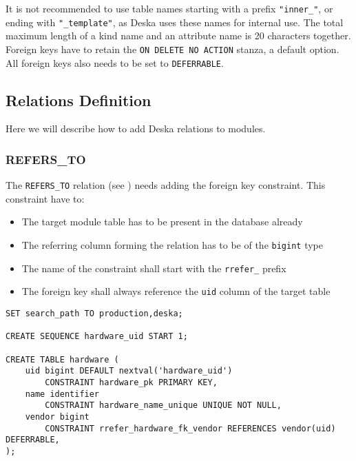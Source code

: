 \documentclass[deska]{subfiles}
\begin{document}
It is not recommended to use table names starting with a prefix {\tt "inner\_"}, or ending with {\tt "\_template"}, as
Deska uses these names for internal use.  The total maximum length of a kind name and an attribute name is 20 characters
together.  Foreign keys have to retain the {\tt ON DELETE NO ACTION} stanza, a default option. All foreign keys also
needs to be set to {\tt DEFERRABLE}.

\subsection{Relations Definition}
Here we will describe how to add Deska relations to modules.


\subsubsection{REFERS\_TO}
\label{sec:db-scheme-refers-to}

The {\tt REFERS\_TO} relation (see ) needs adding the foreign key constraint. This
constraint have to:

\begin{itemize}
    \item The target module table has to be present in the database already
    \item The referring column forming the relation has to be of the {\tt bigint} type
    \item The name of the constraint shall start with the {\tt rrefer\_} prefix
    \item The foreign key shall always reference the {\tt uid} column of the target table
\end{itemize}

\begin{verbatim}
SET search_path TO production,deska;

CREATE SEQUENCE hardware_uid START 1;

CREATE TABLE hardware (
    uid bigint DEFAULT nextval('hardware_uid')
        CONSTRAINT hardware_pk PRIMARY KEY,
    name identifier
        CONSTRAINT hardware_name_unique UNIQUE NOT NULL,
    vendor bigint 
        CONSTRAINT rrefer_hardware_fk_vendor REFERENCES vendor(uid) DEFERRABLE,
);
\end{verbatim}
\end{document}
